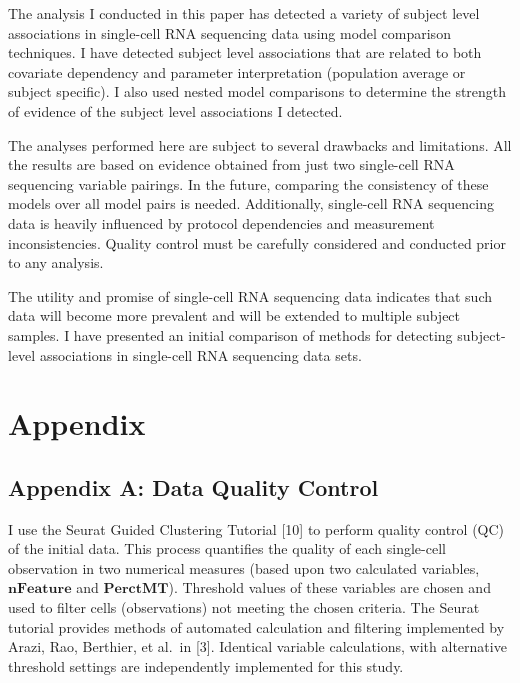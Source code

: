 \documentclass[12pt,]{article}
\begin{document}
The analysis I conducted in this paper has detected a variety of subject
level associations in single-cell RNA sequencing data using model
comparison techniques. I have detected subject level associations that
are related to both covariate dependency and parameter interpretation
(population average or subject specific). I also used nested model
comparisons to determine the strength of evidence of the subject level
associations I detected.

The analyses performed here are subject to several drawbacks and
limitations. All the results are based on evidence obtained from just
two single-cell RNA sequencing variable pairings. In the future,
comparing the consistency of these models over all model pairs is
needed. Additionally, single-cell RNA sequencing data is heavily
influenced by protocol dependencies and measurement inconsistencies.
Quality control must be carefully considered and conducted prior to any
analysis.

The utility and promise of single-cell RNA sequencing data indicates
that such data will become more prevalent and will be extended to
multiple subject samples. I have presented an initial comparison of
methods for detecting subject-level associations in single-cell RNA
sequencing data sets.

\newpage

\hypertarget{appendix}{%
\section{Appendix}\label{appendix}}

\hypertarget{appendix-a-data-quality-control}{%
\subsection{Appendix A: Data Quality
Control}\label{appendix-a-data-quality-control}}

I use the Seurat Guided Clustering Tutorial {[}10{]} to perform quality
control (QC) of the initial data. This process quantifies the quality of
each single-cell observation in two numerical measures (based upon two
calculated variables, \(\mathbf{nFeature}\) and \(\mathbf{PerctMT}\)).
Threshold values of these variables are chosen and used to filter cells
(observations) not meeting the chosen criteria. The Seurat tutorial
provides methods of automated calculation and filtering implemented by
Arazi, Rao, Berthier, et al.~in {[}3{]}. Identical variable
calculations, with alternative threshold settings are independently
implemented for this study.
\end{document}
